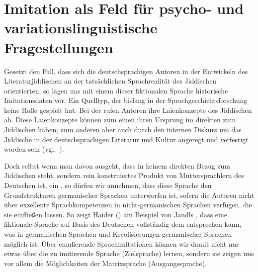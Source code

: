 \section{Imitation als Feld für psycho- und variationslinguistische Fragestellungen}\label{salienz}
 
Gesetzt den Fall, dass sich die deutschsprachigen Autoren in der Entwickeln des Literaturjiddischen an der tatsächlichen Sprachrealität des Jiddischen orientierten, so lägen uns mit einem  dieser fiktionalen Sprache historische Imitationsdaten vor. Ein Quelltyp, der bislang in der Sprachgeschichtsforschung keine Rolle gespielt hat. Bei der  rufen Autoren ihre Laienkonzepte des Jiddischen ab. Diese Laienkonzepte können zum einen ihren Ursprung im direkten  zum Jiddischen haben, zum anderen aber auch durch den internen Diskurs um das Jiddische in der deutschsprachigen Literatur und Kultur angeregt und verfestigt worden sein (vgl.\, \citealt[98f]{Richter1995}).   

Doch selbst wenn man davon ausgeht, dass  in keinem direkten Bezug zum Jiddischen steht, sondern rein konstruiertes Produkt von Muttersprachlern des Deutschen ist, ein , so dürfen wir annehmen, dass diese Sprache den Grundstrukturen germanischer Sprachen unterworfen ist, sofern die Autoren nicht über exzellente Sprachkompetenzen in nicht-germanischen Sprachen verfügen, die sie einfließen lassen. So zeigt Haider (\citeyear{Haider2007}) am Beispiel von Jandls , dass eine fiktionale Sprache auf Basis des Deutschen vollständig dem entsprechen kann, was in germanischen Sprachen und Kreolisierungen germanischer Sprachen möglich ist. Über emulierende Sprachimitationen können wir damit nicht nur etwas über die zu imitierende Sprache (Zielsprache) lernen, sondern sie zeigen uns vor allem die Möglichkeiten der Matrixsprache (Ausgangssprache).\label{viskoserstemal}

